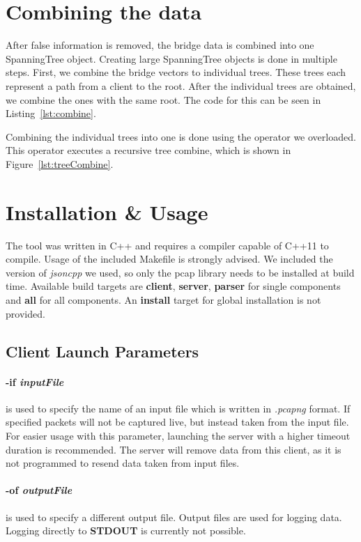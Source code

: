 \section{Combining the data}
\label{combining_data}
After false information is removed, the bridge data is combined into one SpanningTree object.
Creating large SpanningTree objects is done in multiple steps.
First, we combine the bridge vectors to individual trees.
These trees each represent a path from a client to the root.
After the individual trees are obtained, we combine the ones with the same root.
The code for this can be seen in Listing~\ref{lst:combine}.

Combining the individual trees into one is done using the operator we overloaded.
This operator executes a recursive tree combine, which is shown in Figure~\ref{lst:treeCombine}.


\section{Installation \& Usage}
The tool was written in C++ and requires a compiler capable of C++11 to compile.
Usage of the included Makefile is strongly advised.
We included the version of \textit{jsoncpp} we used, so only the pcap library needs to be installed at build time.
Available build targets are \textbf{client}, \textbf{server}, \textbf{parser} for single components and \textbf{all} for all components.
An \textbf{install} target for global installation is not provided.
\subsection*{Client Launch Parameters}
\paragraph{-if \textit{inputFile}} is  used to specify the name of an input file which is written in \textit{.pcapng} format.
If specified packets will not be captured live, but instead taken from the input file.
For easier usage with this parameter, launching the server with a higher timeout duration is recommended.
The server will remove data from this client, as it is not programmed to resend data taken from input files.

\paragraph{-of \textit{outputFile}} is used to specify a different output file.
Output files are used for logging data.
Logging directly to \textbf{STDOUT} is currently not possible.

